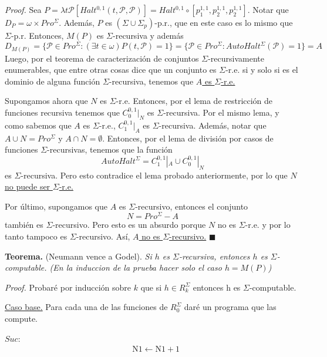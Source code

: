 \documentclass{article}
\begin{document}
\textit{Proof.} Sea $P = \lambda{t}\mathcal{P}[Halt^{0,1}(t, \mathcal{P}, \mathcal{P})] = Halt^{0,1} \circ [p^{1,1}_1, p^{1,1}_2, p^{1,1}_2]$. Notar que $D_P = \omega \times Pro^{\Sigma}$. Además, $P$ es $(\Sigma \cup \Sigma_p)$-p.r., que en este caso es lo mismo que $\Sigma$-p.r. Entonces, $M(P)$ es $\Sigma$-recursiva y además 
\[
    D_{M(P)} = \{\mathcal{P} \in Pro^{\Sigma} : (\exists t \in \omega) P(t, \mathcal{P}) = 1 \} = \{\mathcal{P} \in Pro^{\Sigma} :  AutoHalt^{\Sigma}(\mathcal{P}) = 1 \} = A
\]
Luego, por el teorema de caracterización de conjuntos $\Sigma$-recursivamente enumerables, que entre otras cosas dice que un conjunto es $\Sigma$-r.e. si y solo si es el dominio de alguna función $\Sigma$-recursiva, tenemos que \underline{$A$ es $\Sigma$-r.e.}

Supongamos ahora que $N$ es $\Sigma$-r.e. Entonces, por el lema de restricción de funciones recursiva tenemos que $C^{0,1}_0 |_{N}$ es $\Sigma$-recursiva. Por el mismo lema, y como sabemos que $A$ es $\Sigma$-r.e., $C^{0,1}_1 |_{A}$ es $\Sigma$-recursiva. Además, notar que $A \cup N = Pro^{\Sigma}$ y $A \cap N = \emptyset$. Entonces, por el lema de división por casos de funciones $\Sigma$-recursivas, tenemos que la función
\[
    AutoHalt^{\Sigma} = C^{0,1}_1 |_{A} \cup C^{0,1}_0 |_{N}
\]
es $\Sigma$-recursiva. Pero esto contradice el lema probado anteriormente, por lo que \underline{$N$ no puede ser $\Sigma$-r.e.}

Por último, supongamos que $A$ es $\Sigma$-recursivo, entonces el conjunto
\[
    N = Pro^{\Sigma} - A
\]
también es $\Sigma$-recursivo. Pero esto es un absurdo porque $N$ no es $\Sigma$-r.e. y por lo tanto tampoco es $\Sigma$-recursivo. Así, \underline{$A$ no es $\Sigma$-recursivo.}
\hfill $\blacksquare$
\vspace{4em}

\textbf{Teorema.} (Neumann vence a Godel). \textit{Si $h$ es $\Sigma$-recursiva, entonces $h$ es $\Sigma$-computable.
(En la induccion de la prueba hacer solo el caso $h = M(P)$)}

\textit{Proof.} Probaré por inducción sobre $k$ que si $h \in R^{\Sigma}_k$ entonces h es $\Sigma$-computable.

\underline{Caso base.} Para cada una de las funciones de $R^{\Sigma}_0$ daré un programa que las compute.
\vspace{1em}

\indent $Suc$:
\[
\begin{array}{ll}
    & \text{N1} \leftarrow \text{N1} + 1
\end{array}
\]
\end{document}
